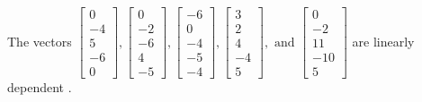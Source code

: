 \begin{exercise}
\begin{exerciseStatement}
  \end{exerciseStatement}
  \begin{exerciseAnswer}
   The vectors \(\left[\begin{array}{r}
0 \\
-4 \\
5 \\
-6 \\
0
\end{array}\right] , \left[\begin{array}{r}
0 \\
-2 \\
-6 \\
4 \\
-5
\end{array}\right] , \left[\begin{array}{r}
-6 \\
0 \\
-4 \\
-5 \\
-4
\end{array}\right] , \left[\begin{array}{r}
3 \\
2 \\
4 \\
-4 \\
5
\end{array}\right] , \text{ and } \left[\begin{array}{r}
0 \\
-2 \\
11 \\
-10 \\
5
\end{array}\right]\) are 
  	 linearly dependent  .
  


  \end{exerciseAnswer}
\end{exercise}